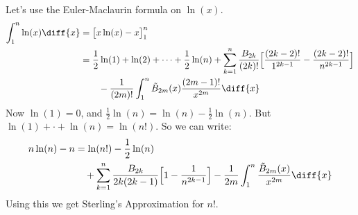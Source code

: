\documentclass[crop=false,class=book,oneside]{standalone}
\begin{document}
        \begin{lexample}
            Let's use the Euler-Maclaurin formula on $\ln(x)$.
            \begin{align}
                \int_{1}^{n}\ln(x)\diff{x}
                &=\big[x\ln(x)-x\big]_{1}^{n}\\
                \nonumber
                &=\frac{1}{2}\ln(1)+\ln(2)+\cdots+\frac{1}{2}\ln(n)
                    +\sum_{k=1}^{n}\frac{B_{2k}}{(2k)!}
                    \Big[
                        \frac{(2k-2)!}{1^{2k-1}}-\frac{(2k-2)!}{n^{2k-1}}
                    \Big]\\
                &\quad\quad
                    -\frac{1}{(2m)!}\int_{1}^{n}\tilde{B}_{2m}(x)
                    \frac{(2m-1)!}{x^{2m}}\diff{x}
            \end{align}
            Now $\ln(1)=0$, and $\frac{1}{2}\ln(n)=\ln(n)-\frac{1}{2}\ln(n)$.
            But $\ln(1)+\cdot+\ln(n)=\ln(n!)$. So we can write:
            \begin{align}
                \nonumber
                n\ln(n)-n&=\ln(n!)-\frac{1}{2}\ln(n)\\
                &\quad
                    +\sum_{k=1}^{n}\frac{B_{2k}}{2k(2k-1)}
                    \Big[1-\frac{1}{n^{2k-1}}\Big]
                    -\frac{1}{2m}\int_{1}^{n}
                    \frac{\tilde{B}_{2m}(x)}{x^{2m}}\diff{x}
            \end{align}
            Using this we get Sterling's Approximation for $n!$.
        \end{lexample}
\end{document}
